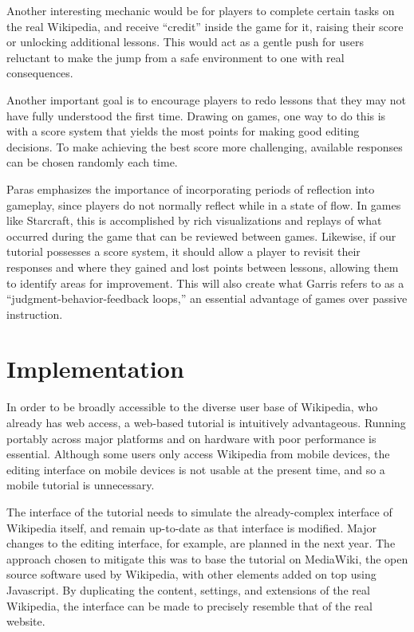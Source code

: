 \documentclass{acm_proc_article-sp}
\begin{document}
Another interesting mechanic would be for players to complete certain tasks on the real Wikipedia, and receive ``credit'' inside the game for it, raising their score or unlocking additional lessons. This would act as a gentle push for users reluctant to make the jump from a safe environment to one with real consequences.

Another important goal is to encourage players to redo lessons that they may not have fully understood the first time. Drawing on games, one way to do this is with a score system that yields the most points for making good editing decisions. To make achieving the best score more challenging, available responses can be chosen randomly each time.

Paras\cite{Paras:2005} emphasizes the importance of incorporating periods of reflection into gameplay, since players do not normally reflect while in a state of flow. In games like Starcraft, this is accomplished by rich visualizations and replays of what occurred during the game that can be reviewed between games. Likewise, if our tutorial possesses a score system, it should allow a player to revisit their responses and where they gained and lost points between lessons, allowing them to identify areas for improvement. This will also create what Garris\cite{Garris:2002} refers to as a ``judgment-behavior-feedback loops,'' an essential advantage of games over passive instruction.

\section{Implementation}

In order to be broadly accessible to the diverse user base of Wikipedia, who already has web access, a web-based tutorial is intuitively advantageous. Running portably across major platforms and on hardware with poor performance is essential. Although some users only access Wikipedia from mobile devices, the editing interface on mobile devices is not usable at the present time, and so a mobile tutorial is unnecessary.

The interface of the tutorial needs to simulate the already-complex interface of Wikipedia itself, and remain up-to-date as that interface is modified. Major changes to the editing interface, for example,  are planned in the next year. The approach chosen to mitigate this was to base the tutorial on MediaWiki, the open source software used by Wikipedia, with other elements added on top using Javascript. By duplicating the content, settings, and extensions of the real Wikipedia, the interface can be made to precisely resemble that of the real website. 
\end{document}
